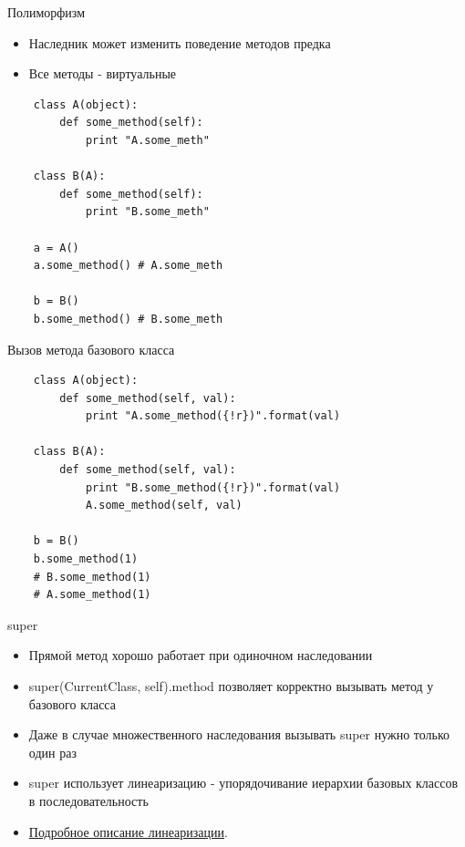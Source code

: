 \documentclass{article}
\begin{document}
\newpage

\begin{center} Полиморфизм \end{center}
\begin{itemize}
    \item Наследник может изменить поведение методов предка
    \item Все методы - виртуальные
\end{itemize}
{
\Large
\vspace{15pt}
\begin{lstlisting}
    class A(object):
        def some_method(self):
            print "A.some_meth"

    class B(A):
        def some_method(self):
            print "B.some_meth"

    a = A() 
    a.some_method() # A.some_meth

    b = B() 
    b.some_method() # B.some_meth
\end{lstlisting}
}
\newpage

\begin{center} Вызов метода базового класса \end{center}
\vspace{15pt}
\begin{lstlisting}
    class A(object):
        def some_method(self, val):
            print "A.some_method({!r})".format(val)

    class B(A):
        def some_method(self, val):
            print "B.some_method({!r})".format(val)
            A.some_method(self, val)

    b = B() 
    b.some_method(1)
    # B.some_method(1)
    # A.some_method(1)
\end{lstlisting}
\newpage

\begin{center} super \end{center}
\begin{itemize}
    \item Прямой метод хорошо работает при одиночном наследовании
    \item super(CurrentClass, self).method позволяет корректно вызывать 
            метод у базового класса
    \item Даже в случае множественного наследования вызывать super нужно только один раз
    \item super использует линеаризацию - упорядочивание иерархии базовых классов в последовательность
    \item \href{http://www.python.org/download/releases/2.3/mro/}{Подробное описание линеаризации}.
\end{itemize}
\newpage
\end{document}
